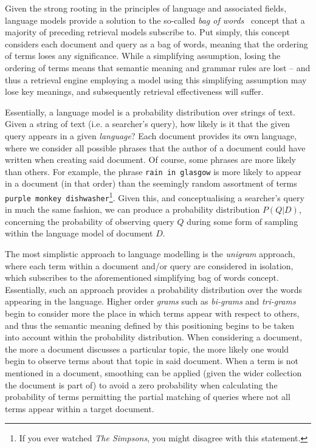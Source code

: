 Given the strong rooting in the principles of language and associated fields, language models provide a solution to the so-called \emph{bag of words}~\citep{harris1954distributional} concept that a majority of preceding retrieval models subscribe to. Put simply, this concept considers each document and query as a bag of words, meaning that the ordering of terms loses any significance. While a simplifying assumption, losing the ordering of terms means that semantic meaning and grammar rules are lost -- and thus a retrieval engine employing a model using this simplifying assumption may lose key meanings, and subsequently retrieval effectiveness will suffer.

Essentially, a language model is a probability distribution over strings of text. Given a string of text (i.e. a searcher's query), how likely is it that the given query appears in a given \emph{language}? Each document provides its own language, where we consider all possible phrases that the author of a document could have written when creating said document. Of course, some phrases are more likely than others. For example, the phrase \texttt{rain in glasgow} is more likely to appear in a document (in that order) than the seemingly random assortment of terms \texttt{purple monkey dishwasher}\footnote{If you ever watched \emph{The Simpsons}, you might disagree with this statement.}. Given this, and conceptualising a searcher's query in much the same fashion, we can produce a probability distribution $P(Q|D)$, concerning the probability of observing query $Q$ during some form of sampling within the language model of document $D$.

The most simplistic approach to language modelling is the \emph{unigram} approach, where each term within a document and/or query are considered in isolation, which subscribes to the aforementioned simplifying bag of words concept. Essentially, such an approach provides a probability distribution over the words appearing in the language. Higher order \emph{grams} such as \emph{bi-grams} and \emph{tri-grams} begin to consider more the place in which terms appear with respect to others, and thus the semantic meaning defined by this positioning begins to be taken into account within the probability distribution. When considering a document, the more a document discusses a particular topic, the more likely one would begin to observe terms about that topic in said document. When a term is not mentioned in a document, smoothing can be applied (given the wider collection the document is part of) to avoid a zero probability when calculating the probability of terms permitting the partial matching of queries where not all terms appear within a target document.

